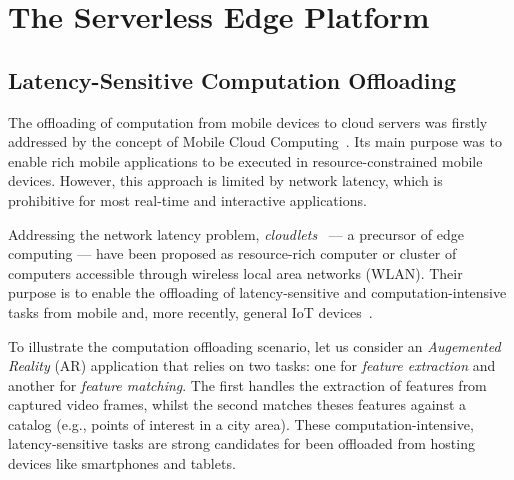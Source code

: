 \section{The Serverless Edge Platform}\label{sec:SEP}

\subsection{Latency-Sensitive Computation Offloading}\label{sec:SEP_MCO}



The offloading of computation from mobile devices to cloud servers was firstly addressed by the concept of Mobile Cloud Computing~\cite{Khan:14}. Its main purpose was to enable rich mobile applications to be executed in resource-constrained mobile devices. However, this approach is limited by network latency, which is prohibitive for most real-time and interactive applications.

Addressing the network latency problem, \textit{cloudlets}~\cite{Satyanarayanan:2009} --- a precursor of edge computing --- have been proposed as resource-rich computer or cluster of computers  accessible through wireless local area networks (WLAN). Their purpose is to enable the offloading of latency-sensitive and computation-intensive tasks from mobile and, more recently, general IoT devices~\cite{Satyanarayanan:2017}. 




To illustrate the computation offloading scenario, let us consider an \textit{Augemented Reality} (AR) application that relies on two tasks: one for \textit{feature extraction} and another for \textit{feature matching}. The first handles the extraction of features from captured video frames, whilst the second matches theses features against a catalog (e.g., points of interest in a city area). 
These computation-intensive, latency-sensitive tasks are strong candidates for been offloaded from hosting devices like smartphones and tablets.

